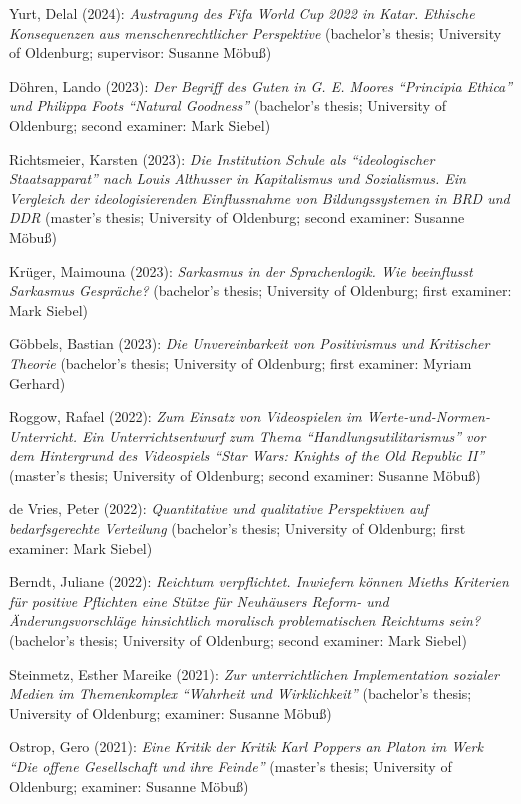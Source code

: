 \documentclass[a4paper,10pt]{article}
\newenvironment{literature}{%
   \parskip6pt\parindent0pt\raggedright
   \def\lititem{\hangindent=1cm\hangafter1}}{%
   \par\ignorespaces}
\begin{document}
\begin{literature}
\lititem Yurt, Delal (2024): \textit{Austragung des Fifa World Cup 2022 in Katar. Ethische Konsequenzen aus menschenrechtlicher Perspektive} (bachelor's thesis; University of Oldenburg; supervisor: Susanne Möbuß)

\lititem Döhren, Lando (2023): \textit{Der Begriff des Guten in G. E. Moores \enquote{Principia Ethica} und Philippa Foots \enquote{Natural Goodness}} (bachelor's thesis; University of Oldenburg; second examiner: Mark Siebel)

\lititem Richtsmeier, Karsten (2023): \textit{Die Institution Schule als \enquote{ideologischer Staatsapparat} nach Louis Althusser in Kapitalismus und Sozialismus. Ein Vergleich der ideologisierenden Einflussnahme von Bildungssystemen in BRD und DDR} (master's thesis; University of Oldenburg; second examiner: Susanne Möbuß)

\lititem Krüger, Maimouna (2023): \textit{Sarkasmus in der Sprachenlogik. Wie beeinflusst Sarkasmus Gespräche?} (bachelor's thesis; University of Oldenburg; first examiner: Mark Siebel)

\lititem Göbbels, Bastian (2023): \textit{Die Unvereinbarkeit von Positivismus und Kritischer Theorie} (bachelor's thesis; University of Oldenburg; first examiner: Myriam Gerhard)

\lititem Roggow, Rafael (2022): \textit{Zum Einsatz von Videospielen im Werte-und-Normen-Unterricht. Ein Unterrichtsentwurf zum Thema \enquote{Handlungsutilitarismus} vor dem Hintergrund des Videospiels \enquote{Star Wars: Knights of the Old Republic II}} (master's thesis; University of Oldenburg; second examiner: Susanne Möbuß)

\lititem de Vries, Peter (2022): \textit{Quantitative und qualitative Perspektiven auf bedarfsgerechte Verteilung} (bachelor's thesis; University of Oldenburg; first examiner: Mark Siebel)

\lititem Berndt, Juliane (2022): \textit{Reichtum verpflichtet. Inwiefern können Mieths Kriterien für positive Pflichten eine Stütze für Neuhäusers Reform- und Änderungsvorschläge hinsichtlich moralisch problematischen Reichtums sein?} (bachelor's thesis; University of Oldenburg; second examiner: Mark Siebel)

\lititem Steinmetz, Esther Mareike (2021): \textit{Zur unterrichtlichen Implementation sozialer Medien im Themenkomplex \enquote{Wahrheit und Wirklichkeit}} (bachelor's thesis; University of Oldenburg; examiner: Susanne Möbuß)

\lititem Ostrop, Gero (2021): \textit{Eine Kritik der Kritik Karl Poppers an Platon im Werk \enquote{Die offene Gesellschaft und ihre Feinde}} (master's thesis; University of Oldenburg; examiner: Susanne Möbuß)


\end{literature}
\end{document}

